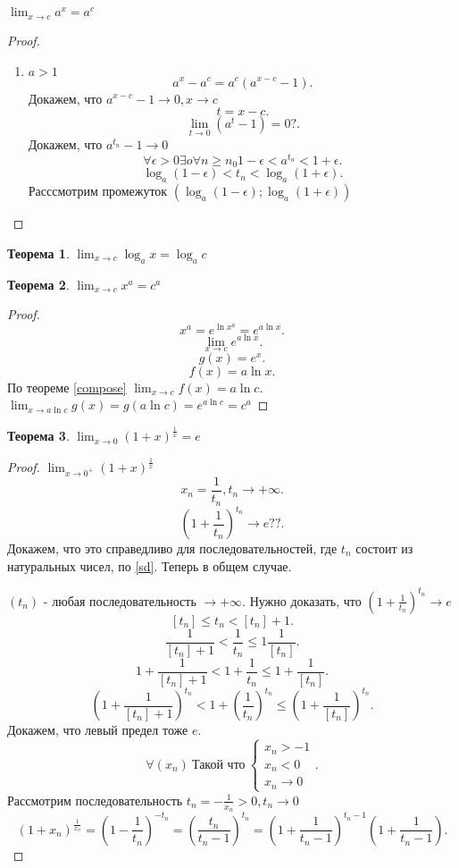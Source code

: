 \documentclass[a4paper]{article}
\newtheorem{theorem}{Теорема}
\begin{document}
\subsection{}
$\lim_{x \to c} a^x = a^c$
\begin{proof}
	\begin{enumerate}
		\item $a>1$
		      \[
			      a^x - a^c = a^c(a^{x - c} - 1)
			      .\]
		      Докажем, что $a^{x - c} - 1 \to 0, x \to c$
		      \[
			      t = x - c
			      .\]
		      \[
			      \lim_{t \to 0} (a^t - 1) = 0 ?
			      .\]
		      Докажем, что $a^{t_n} - 1 \to 0$
		      \[
			      \forall \epsilon > 0 \exists o \forall n \ge n_0 1 - \epsilon < a^{t_n} < 1 + \epsilon
			      .\]
		      \[
			      \log_a{( 1 - \epsilon )} < t_n < \log_a{( 1 + \epsilon )}
			      .\]
		      Расссмотрим промежуток $(\log_a{( 1 - \epsilon )};\log_a{( 1 + \epsilon )})$
	\end{enumerate}
\end{proof}
\begin{theorem}
	$\lim_{x \to c} \log_a{x} = \log_a{c}$
\end{theorem}
\begin{theorem}
	$\lim_{x \to c} x^a = c^a$
\end{theorem}
\begin{proof}
	\[
		x^a = e^{\ln{x^a}}= e^{a\ln{x}}
		.\]
	\[
		\lim_{x \to c} e^{a\ln{x}}
		.\]
	\[
		g(x) = e^x
		.\]
	\[
		f(x) = a\ln{x}
		.\]
	По теореме \ref{compose} $\lim_{x \to c} f(x) = a \ln{c}$. $\lim_{x \to a\ln{c}} g(x) = g(a\ln{c}) = e^{a\ln{c}} = c^a$
\end{proof}
\begin{theorem}
	$\lim_{x \to 0} (1 + x)^{\frac{1}{x}}  = e$
\end{theorem}
\begin{proof}
	$\lim_{x \to 0^+} (1 + x)^{\frac{1}{x}}$
	\[
		x_n = \frac{1}{t_n}, t_n \to +\infty
		.\]
	\[
		(1 + \frac{1}{t_n})^{t_n} \to e ??
		.\]
	Докажем, что это справедливо для последовательностей, где $t_n$ состоит из натуральных чисел, по \ref{sd}. Теперь в общем случае.

	$(t_n)$ - любая последовательность  $\to +\infty$. Нужно доказать, что  $(1 + \frac{1}{t_n})^{t_n} \to e$
	\[
		[t_n] \le t_n <  [t_n] +1
		.\]
	\[
		\frac{1}{[t_n] + 1} < \frac{1}{t_n} \le  1\frac{1}{[t_n]}
		.\]
	\[
		1 + \frac{1}{[t_n] + 1} < 1 + \frac{1}{t_n} \le  1 + \frac{1}{[t_n]}
		.\]
	\[
		( 1 + \frac{1}{[t_n] + 1} )^{t_n}< 1  + ( \frac{1}{t_n} )^{t_n} \le  (1 +  \frac{1}{[t_n]} )^{t_n}
		.\]
	Докажем, что левый предел тоже $e$.
	\[
		\forall  (x_n) ~\text{Такой что} ~
		\begin{cases}
			x_n > -1 \\
			x_n < 0  \\
			x_n \to 0
		\end{cases}
		.\]
	Рассмотрим последовательность $t_n = -\frac{1}{x_n} > 0, t_n \to 0$
	\[
		(1 + x_n)^{\frac{1}{x_n}} = (1 - \frac{1}{t_n})^{-t_n} =
		(\frac{t_n}{t_n -1} )^{t_n} = (1 + \frac{1}{t_n -1 })^{t_n - 1} (1 +  \frac{1}{t_n - 1})
		.\]
\end{proof}
\end{document}
